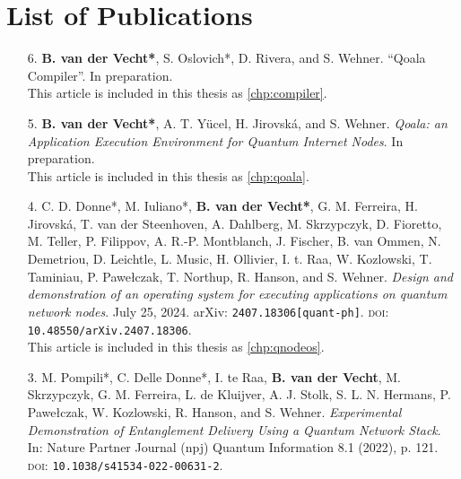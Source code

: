 \chapter*{List of Publications}

\def\aicon{\makebox[1.25em][l]{\footnotesize \faUser}}
\def\ficon{\makebox[1.25em][l]{\footnotesize \faFileTextO}}
\def\picon{\makebox[1.25em][l]{\footnotesize \faPencilSquareO}}

\begin{enumerate}[label={\arabic*.},itemsep=0.7\baselineskip,parsep=0.3\baselineskip]
    \item[6.] \textbf{B. van der Vecht*}, S. Oslovich*, D. Rivera, and S. Wehner. ``Qoala Compiler''. In preparation.
        \\ \ficon This article is included in this thesis as \cref{chp:compiler}.

    \item[5.]
        \textbf{B. van der Vecht*}, A. T. Yücel, H. Jirovská, and S. Wehner.
        \textit{Qoala: an Application Execution Environment for Quantum Internet Nodes}.
        In preparation. 
        \\ \ficon This article is included in this thesis as \cref{chp:qoala}.

    \item[4.]
        C. D. Donne*, M. Iuliano*, \textbf{B. van der Vecht*}, G. M. Ferreira, H. Jirovská, T. van der Steenhoven, A. Dahlberg, M. Skrzypczyk, D. Fioretto, M. Teller, P. Filippov, A. R.-P. Montblanch, J. Fischer, B. van Ommen, N. Demetriou, D. Leichtle, L. Music, H. Ollivier, I. t. Raa, W. Kozlowski, T. Taminiau, P. Pawełczak, T. Northup, R. Hanson, and S. Wehner.
        \textit{Design and demonstration of an operating system for executing applications on quantum network nodes}.
        July 25, 2024.
        arXiv: \texttt{2407.18306[quant-ph]}.
        {\small \textsc{doi:}} \texttt{10.48550/arXiv.2407.18306}. 
        \\ \ficon This article is included in this thesis as \cref{chp:qnodeos}.

    \item[3.]
        M. Pompili*, C. Delle Donne*, I. te Raa, \textbf{B. van der Vecht}, M. Skrzypczyk, G. M. Ferreira, L. de Kluijver, A. J. Stolk, S. L. N. Hermans, P. Pawełczak, W. Kozlowski, R. Hanson, and S. Wehner.
        \textit{Experimental Demonstration of Entanglement Delivery Using a Quantum Network Stack}.
        In: Nature Partner Journal (npj) Quantum Information 8.1 (2022), p. 121.
        {\small \textsc{doi:}} \texttt{10.1038/s41534-022-00631-2}.


\end{enumerate}
